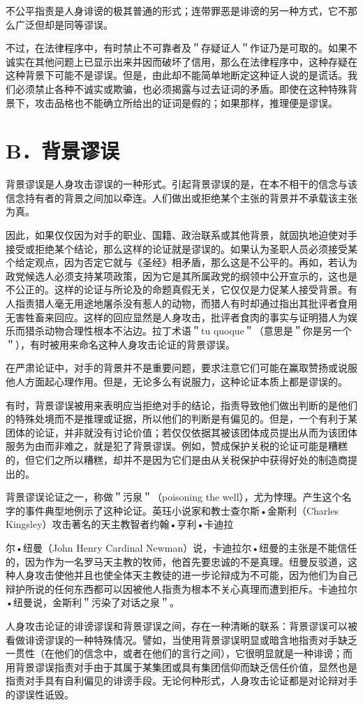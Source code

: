 不公平指责是人身诽谤的极其普通的形式；连带罪恶是诽谤的另一种方式，它不那么广泛但却是同等谬误。

不过，在法律程序中，有时禁止不可靠者及＂存疑证人＂作证乃是可取的。如果不诚实在其他问题上已显示出来并因而破坏了信用，那么在法律程序中，这种存疑在这种背景下可能不是谬误。但是，由此却不能简单地断定这种证人说的是谎话。我们必须禁止各种不诚实或欺骗，也必须揭露与过去证词的矛盾。即使在这种特殊背景下，攻击品格也不能确立所给出的证词是假的；如果那样，推理便是谬误。

\section*{B．背景谬误}
背景谬误是人身攻击谬误的一种形式。引起背景谬误的是，在本不相干的信念与该信念持有者的背景之间加以牵连。人们做出或拒绝某个主张的背景并不承载该主张为真。

因此，如果仅仅因为对手的职业、国籍、政治联系或其他背景，就固执地迫使对手接受或拒绝某个结论，那么这样的论证就是谬误的。如果认为圣职人员必须接受某个给定观点，因为否定它就与《圣经》相矛盾，那么这是不公平的。再如，若认为政党候选人必须支持某项政策，因为它是其所属政党的纲领中公开宣示的，这也是不公正的。这样的论证与所论及的命题真假无关，它仅仅是力促某人接受背景。有人指责猎人毫无用途地屠杀没有惹人的动物，而猎人有时却通过指出其批评者食用无害牲畜来回应。这样的回应显然是人身攻击，批评者食肉的事实与证明猎人为娱乐而猎杀动物合理性根本不沾边。拉丁术语＂tu quoque＂（意思是＂你是另一个＂），有时被用来命名这种人身攻击论证的背景谬误。

在严肃论证中，对手的背景并不是重要问题，要求注意它们可能在鸁取赞扬或说服他人方面起心理作用。但是，无论多么有说服力，这种论证本质上都是谬误的。

有时，背景谬误被用来表明应当拒绝对手的结论，指责导致他们做出判断的是他们的特殊处境而不是推理或证据，所以他们的判断是有偏见的。但是，一个有利于某团体的论证，并非就没有讨论价值；若仅仅依据其被该团体成员提出从而为该团体服务为由而非难之，就是犯了背景谬误。例如，赞成保护关税的论证可能是糟糕的，但它们之所以糟糕，却并不是因为它们是由从关税保护中获得好处的制造商提出的。

背景谬误论证之一，称做＂污泉＂（poisoning the well），尤为悖理。产生这个名字的事件典型地例示了这种论证。英珏小说家和教士查尔斯•金斯利（Charles Kingsley）攻击著名的天主教智者约翰•亨利•卡迪拉

尔•纽曼（John Henry Cardinal Newman）说，卡迪拉尔•纽曼的主张是不能信任的，因为作为一名罗马天主教的牧师，他首先要忠诚的不是真理。纽曼反驳道，这种人身攻击使他并且也使全体天主教徒的进一步论辩成为不可能，因为他们为自己辩护所说的任何东西都可以因被他人指责为根本不关心真理而遭到拒斥。卡迪拉尔•纽曼说，金斯利＂污染了对话之泉＂。

人身攻击论证的诽谤谬误和背景谬误之间，存在一种清晰的联系：背景谬误可以被看做诽谤谬误的一种特殊情况。譬如，当使用背景谬误明显或暗含地指责对手缺乏一贯性（在他们的信念中，或者在他们的言行之间），它很明显就是一种诽谤；而用背景谬误指责对手由于其属于某集团或具有集团信仰而缺乏信任价值，显然也是指责对手具有自利偏见的诽谤手段。无论何种形式，人身攻击论证都是对论辩对手的谬误性诋毁。 